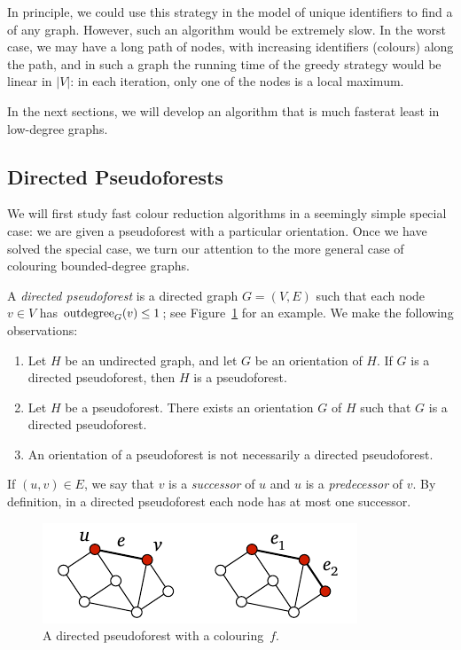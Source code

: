 In principle, we could use this strategy in the model of unique identifiers to find a \Dpocol{} of any graph. However, such an algorithm would be extremely slow. In the worst case, we may have a long path of nodes, with increasing identifiers (colours) along the path, and in such a graph the running time of the greedy strategy would be linear in $|V|$: in each iteration, only one of the nodes is a local maximum.

In the next sections, we will develop an algorithm that is much faster\mydash at least in low-degree graphs.


\subsection{Directed Pseudoforests}

We will first study fast colour reduction algorithms in a seemingly simple special case: we are given a pseudoforest with a particular orientation. Once we have solved the special case, we turn our attention to the more general case of colouring bounded-degree graphs.

A \emph{directed pseudoforest} is a directed graph $G = (V,E)$ such that each node $v \in V$ has $\operatorname{outdegree}_G(v) \le 1$; see Figure~\ref{fig:dp} for an example. We make the following observations:
\begin{enumerate}
    \item Let $H$ be an undirected graph, and let $G$ be an orientation of $H$. If $G$ is a directed pseudoforest, then $H$ is a pseudoforest.
    \item Let $H$ be a pseudoforest. There exists an orientation $G$ of $H$ such that $G$ is a directed pseudoforest.
    \item An orientation of a pseudoforest is not necessarily a directed pseudoforest.
\end{enumerate}
If $(u,v) \in E$, we say that $v$ is a \emph{successor} of $u$ and $u$ is a \emph{predecessor} of $v$. By definition, in a directed pseudoforest each node has at most one successor.

\begin{figure}
    \centering
    \includegraphics[page=\PDP]{figs.pdf}
    \caption{A directed pseudoforest with a colouring~$f$.}\label{fig:dp}
\end{figure}

